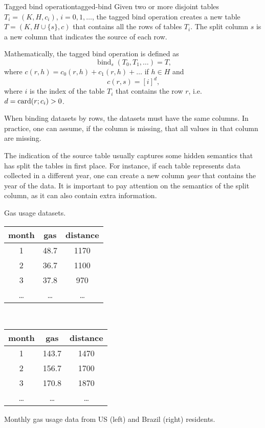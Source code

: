 \begin{defbox}{Tagged bind operation}{tagged-bind}
  Given two or more disjoint tables $T_i = (K, H, c_i)$, $i = 0, 1, \dots$, the tagged
  bind operation creates a new table $T = (K, H \cup \{s\}, c)$ that contains all the rows
  of tables $T_i$.  The split column $s$ is a new column that indicates the source of each
  row.

  Mathematically, the tagged bind operation is defined as \[
    \operatorname{bind}_{s}(T_0, T_1, \dots) = T\text{,}
  \] where $c(r, h) = c_0(r, h) + c_1(r, h) + \dots$ if $h \in H$ and \[
    c(r, s) = \left[ i \right]^{d} \text{,}
  \]
  where $i$ is the index of the table $T_i$ that contains the row $r$, i.e. $d =
  \rowcard[r; c_i] > 0$.
\end{defbox}

When binding datasets by rows, the datasets must have the same columns.  In practice,
one can assume, if the column is missing, that all values in that column are missing.

The indication of the source table usually captures some hidden semantics that has split
the tables in first place. For instance, if each table represents data collected in a
different year, one can create a new column \emph{year} that contains the year of the
data.  It is important to pay attention on the semantics of the split column, as it can
also contain extra information.

\begin{tablebox}[label=tab:gas-usage]{Gas usage datasets.}
  \centering
  \begin{tabular}{ccc}
    \toprule
    \textbf{month} & \textbf{gas} & \textbf{distance} \\
    \midrule
    1 & 48.7 & 1170 \\
    2 & 36.7 & 1100 \\
    3 & 37.8 & 970 \\
    \dots & \dots & \dots \\
    \bottomrule
  \end{tabular}
  ~
  \begin{tabular}{ccc}
    \toprule
    \textbf{month} & \textbf{gas} & \textbf{distance} \\
    \midrule
    1 & 143.7 & 1470 \\
    2 & 156.7 & 1700 \\
    3 & 170.8 & 1870 \\
    \dots & \dots & \dots \\
    \bottomrule
  \end{tabular}
  \tcblower
  Monthly gas usage data from US (left) and Brazil (right) residents.
\end{tablebox}

